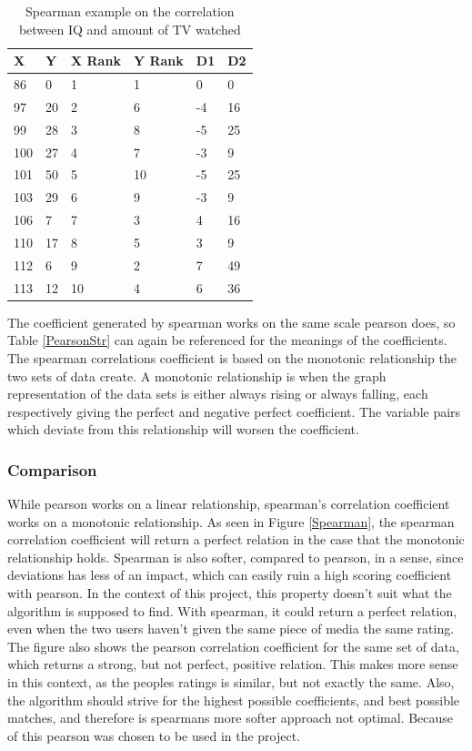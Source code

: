 \begin{table}[htb]
\centering
\begin{tabular}{|l|l|l|l|l|l|} \hline
	\textbf{X} & \textbf{Y} & \textbf{X Rank} & \textbf{Y Rank} & \textbf{D1} & \textbf{D2} \\ \hline
	86 & 0 & 1 & 1 & 0 & 0 \\ \hline
	97 & 20 & 2 & 6 & -4 & 16 \\ \hline
	99 & 28 & 3 & 8 & -5 & 25 \\ \hline
	100 & 27 & 4 & 7 & -3 & 9 \\ \hline
	101 & 50 & 5 & 10 & -5 & 25 \\ \hline
	103 & 29 & 6 & 9 & -3 & 9 \\ \hline
	106 & 7 & 7 & 3 & 4 & 16 \\ \hline
	110 & 17 & 8 & 5 & 3 & 9 \\ \hline
	112 & 6 & 9 & 2 & 7 & 49 \\ \hline
	113 & 12 & 10 & 4 & 6 & 36 \\ \hline
\end{tabular}
\caption{Spearman example on the correlation between IQ and amount of TV watched}
\label{SpearmanEx}
\end{table}

The coefficient generated by spearman works on the same scale pearson does, so Table \ref{PearsonStr} can again be referenced for the meanings of the coefficients. The spearman correlations coefficient is based on the monotonic relationship the two sets of data create\cite{Spearman2}. A monotonic relationship is when the graph representation of the data sets is either always rising or always falling, each respectively giving the perfect and negative perfect coefficient. The variable pairs which deviate from this relationship will worsen the coefficient.

\subsubsection{Comparison}

While pearson works on a linear relationship, spearman’s correlation coefficient works on a monotonic relationship. As seen in Figure \ref{Spearman}, the spearman correlation coefficient will return a perfect relation in the case that the monotonic relationship holds. Spearman is also softer, compared to pearson, in a sense, since deviations has less of an impact, which can easily ruin a high scoring coefficient with pearson. In the context of this project, this property doesn’t suit what the algorithm is supposed to find. With spearman, it could return a perfect relation, even when the two users haven’t given the same piece of media the same rating. The figure also shows the pearson correlation coefficient for the same set of data, which returns a strong, but not perfect, positive relation. This makes more sense in this context, as the peoples ratings is similar, but not exactly the same. Also, the algorithm should strive for the highest possible coefficients, and best possible matches, and therefore is spearmans more softer approach not optimal. Because of this pearson was chosen to be used in the project.

